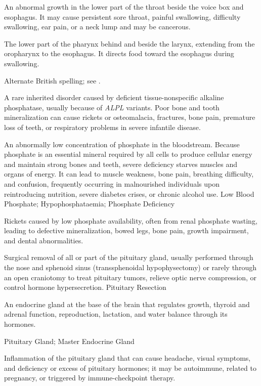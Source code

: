  An abnormal growth in the lower part of the throat beside the voice box and esophagus. It may cause persistent sore throat, painful swallowing, difficulty swallowing, ear pain, or a neck lump and may be cancerous.

 The lower part of the pharynx behind and beside the larynx, extending from the oropharynx to the esophagus. It directs food toward the esophagus during swallowing.

 Alternate British spelling; see .

 A rare inherited disorder caused by deficient tissue-nonspecific alkaline phosphatase, usually because of \textit{ALPL} variants. Poor bone and tooth mineralization can cause rickets or osteomalacia, fractures, bone pain, premature loss of teeth, or respiratory problems in severe infantile disease.

 An abnormally low concentration of phosphate in the bloodstream. Because phosphate is an essential mineral required by all cells to produce cellular energy and maintain strong bones and teeth, severe deficiency starves muscles and organs of energy. It can lead to muscle weakness, bone pain, breathing difficulty, and confusion, frequently occurring in malnourished individuals upon reintroducing nutrition, severe diabetes crises, or chronic alcohol use.
\synonyms
Low Blood Phosphate; Hypophosphataemia; Phosphate Deficiency

 Rickets caused by low phosphate availability, often from renal phosphate wasting, leading to defective mineralization, bowed legs, bone pain, growth impairment, and dental abnormalities.

 Surgical removal of all or part of the pituitary gland, usually performed through the nose and sphenoid sinus (transsphenoidal hypophysectomy) or rarely through an open craniotomy to treat pituitary tumors, relieve optic nerve compression, or control hormone hypersecretion.
\synonyms
Pituitary Resection

 An endocrine gland at the base of the brain that regulates growth, thyroid and adrenal function, reproduction, lactation, and water balance through its hormones.

\synonyms
Pituitary Gland; Master Endocrine Gland

 Inflammation of the pituitary gland that can cause headache, visual symptoms, and deficiency or excess of pituitary hormones; it may be autoimmune, related to pregnancy, or triggered by immune-checkpoint therapy.

